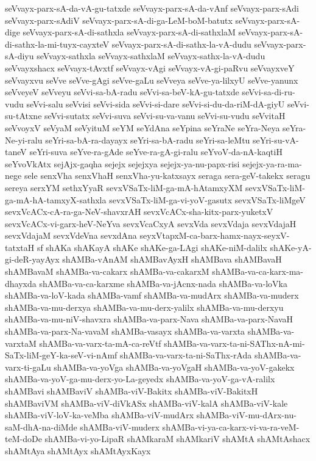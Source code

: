 {seVvayx-parx-sA-da-vA-gu-tatxde
seVvayx-parx-sA-da-vAnf
seVvayx-parx-sAdi
seVvayx-parx-sAdiV
seVvayx-parx-sA-di-ga-LeM-boM-batutx
seVvayx-parx-sA-dige
seVvayx-parx-sA-di-sathxla
seVvayx-parx-sA-di-sathxlaM
seVvayx-parx-sA-di-sathx-la-mi-tuyx-cayxteV
seVvayx-parx-sA-di-sathx-la-vA-dudu
seVvayx-parx-sA-diyu
seVvayx-sathxla
seVvayx-sathxlaM
seVvayx-sathx-la-vA-dudu
seVvayxshacx
seVvayx-tAvxtf
seVvayx-vAgi
seVvayx-vA-gi-paRvu
seVvayxveY
seVvayxvu
seVve
seVve-gAgi
seVve-gaLu
seVveya
seVve-ya-lilxyU
seVve-yanunx
seVveyeV
seVveyu
seVvi-sa-bA-radu
seVvi-sa-beV-kA-gu-tatxde
seVvi-sa-di-ru-vudu
seVvi-salu
seVvisi
seVvi-sida
seVvi-si-dare
seVvi-si-du-da-riM-dA-giyU
seVvi-su-tAtxne
seVvi-sutatx
seVvi-suva
seVvi-su-va-vanu
seVvi-su-vudu
seVvitaH
seVvoyxV
seVyaM
seVyituM
seYM
seYdAna
seYpina
seYraNe
seYra-Neya
seYra-Ne-yi-ralu
seYri-sa-bA-ra-dayayx
seYri-sa-bA-radu
seYri-sa-leMtu
seYri-su-vA-taneV
seYri-suva
seYve-ra-gAde
seYve-ra-gA-gi-ralu
seYvoV-da-nA-kaqtiH
seYvoVkAtx
sejAjx-gaqha
sejejx
sejejxya
sejejx-ya-nu-papx-risi
sejejx-ya-ra-ma-nege
sele
senxVha
senxVhaH
senxVha-yu-katxsayx
seraga
sera-geV-takekx
seragu
sereya
serxYM
sethxYyaR
sevxVSaTx-liM-ga-mA-hAtamxyXM
sevxVSaTx-liM-ga-mA-hA-tamxyX-sathxla
sevxVSaTx-liM-ga-vi-yoV-gasutx
sevxVSaTx-liMgeV
sevxVcACx-cA-ra-ga-NeV-shavxrAH
sevxVcACx-sha-kitx-parx-yuketxV
sevxVcACx-vi-garx-heV-NeYva
sevxVcaCxyA
sevxVda
sevxVdaja
sevxVdajaH
sevxVdajaM
sevxVdeVna
sevxdAna
seyxVtapxM-ca-barx-hamx-nayx-seyxV-tatxtaH
sf
shAKa
shAKayA
shAKe
shAKe-ga-LAgi
shAKe-niM-dalilx
shAKe-yA-gi-deR-yayAyx
shAMBa-vAnAM
shAMBavAyxH
shAMBava
shAMBavaH
shAMBavaM
shAMBa-va-cakarx
shAMBa-va-cakarxM
shAMBa-va-ca-karx-ma-dhayxda
shAMBa-va-ca-karxme
shAMBa-va-jAcnx-nada
shAMBa-va-loVka
shAMBa-va-loV-kada
shAMBa-vamf
shAMBa-va-mudArx
shAMBa-va-muderx
shAMBa-va-mu-derxya
shAMBa-va-mu-derx-yalilx
shAMBa-va-mu-derxyu
shAMBa-va-mu-niV-shavxra
shAMBa-va-parx-Nava
shAMBa-va-parx-NavaH
shAMBa-va-parx-Na-vavaM
shAMBa-vasayx
shAMBa-va-varxta
shAMBa-va-varxtaM
shAMBa-va-varx-ta-mA-ca-reVtf
shAMBa-va-varx-ta-ni-SAThx-nA-mi-SaTx-liM-geY-ka-seV-vi-nAmf
shAMBa-va-varx-ta-ni-SaThx-rAda
shAMBa-va-varx-ti-gaLu
shAMBa-va-yoVga
shAMBa-va-yoVgaH
shAMBa-va-yoV-gakekx
shAMBa-va-yoV-ga-mu-derx-yo-La-geyedx
shAMBa-va-yoV-ga-vA-ralilx
shAMBavi
shAMBaviV
shAMBa-viV-Bakitx
shAMBa-viV-BakitxH
shAMBaviVM
shAMBa-viV-diVkASx
shAMBa-viV-kalA
shAMBa-viV-kale
shAMBa-viV-loV-ka-veMba
shAMBa-viV-mudArx
shAMBa-viV-mu-dArx-nu-saM-dhA-na-diMde
shAMBa-viV-muderx
shAMBa-vi-ya-ca-karx-vi-va-ra-veM-teM-doDe
shAMBa-vi-yo-LipaR
shAMkaraM
shAMkariV
shAMtA
shAMtAshacx
shAMtAya
shAMtAyx
shAMtAyxKayx
}
